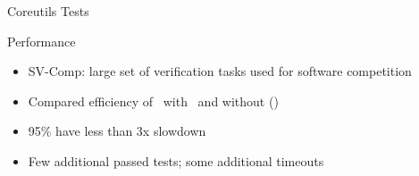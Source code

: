 \documentclass[aspectratio=169]{beamer}
\begin{document}
\begin{frame}{Coreutils Tests}

\end{frame}

\begin{frame}{Performance}
    \begin{itemize}
        \item SV-Comp: large set of verification tasks used for software competition
        \item Compared efficiency of \goblint\ with \cpo\ and without (\base)
        \item 95\% have less than 3x slowdown
        \item Few additional passed tests; some additional timeouts
    \end{itemize}
\end{frame}
\end{document}
